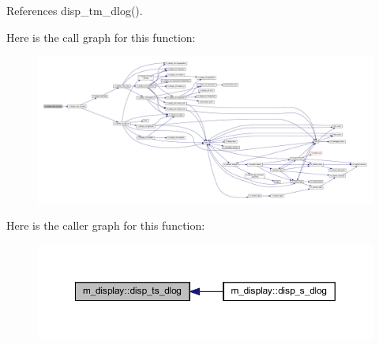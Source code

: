 References disp\+\_\+tm\+\_\+dlog().

Here is the call graph for this function\+:
\nopagebreak
\begin{figure}[H]
\begin{center}
\leavevmode
\includegraphics[width=350pt]{namespacem__display_a7d4d5976a28b9a9ee9bad6afb0f8a7b9_cgraph}
\end{center}
\end{figure}
Here is the caller graph for this function\+:
\nopagebreak
\begin{figure}[H]
\begin{center}
\leavevmode
\includegraphics[width=350pt]{namespacem__display_a7d4d5976a28b9a9ee9bad6afb0f8a7b9_icgraph}
\end{center}
\end{figure}
\mbox{\label{namespacem__display_a7ecc86ce58006c0d4d08efcfdaaf479a}} 
